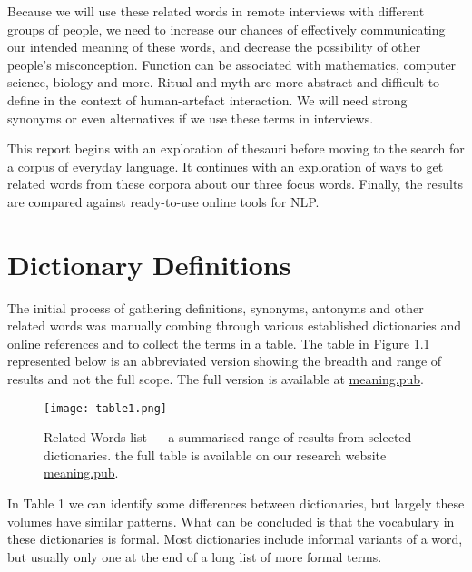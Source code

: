 \documentclass[12pt, usenames, dvipsnames]{report}
\begin{document}
\begin{flushleft}
Because we will use these related words in remote interviews with different groups of people, we need to increase our chances of effectively communicating our intended meaning of these words, and decrease the possibility of other people’s misconception.
Function can be associated with mathematics, computer science, biology and more.
Ritual and myth are more abstract and difficult to define in the context of human-artefact interaction.
We will need strong synonyms or even alternatives if we use these terms in interviews.

This report begins with an exploration of thesauri before moving to the search for a corpus of everyday language.
It continues with an exploration of ways to get related words from these corpora about our three focus words.
Finally, the results are compared against ready-to-use online tools for NLP.


\chapter{Dictionary Definitions}

The initial process of gathering definitions, synonyms, antonyms and other related words was manually combing through various established dictionaries and online references and to collect the terms in a table.
The table in Figure \ref{tab:table1} represented below is an abbreviated version showing the breadth and range of results and not the full scope.
The full version is available at \href{https://meaning.pub.}{meaning.pub}.

\vspace*{1.2em}
\begin{figure}[!htbp]
  \hspace*{-3.666em}
  \texttt{[image: table1.png]}
  \caption{Related Words list --- a summarised range of results from selected dictionaries. the full table is available on our research website \href{https://meaning.pub.}{meaning.pub}.}
  \label{tab:table1}
\end{figure}
\vspace*{1.2em}

In Table 1 we can identify some differences between dictionaries, but largely these volumes have similar patterns.
What can be concluded is that the vocabulary in these dictionaries is formal.
Most dictionaries include informal variants of a word, but usually only one at the end of a long list of more formal terms.


\end{flushleft}
\end{document}
